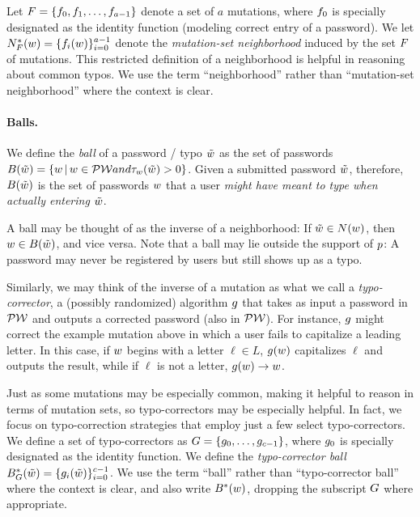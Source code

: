 Let $F = \{f_0, f_1, \ldots, f_{a-1}\}$ denote a set of $a$
mutations, where $f_0$ is specially designated as the identity function
(modeling correct entry of a password). We let $N^*_F({w}) =
\{f_i({w})\}_{i=0}^{a-1}$ denote the {\em mutation-set neighborhood} induced
by the set $F$ of mutations. This restricted definition of a neighborhood
is helpful in reasoning about common typos. We use the term ``neighborhood''
rather than ``mutation-set neighborhood'' where the context is clear.

\paragraph{Balls.} We define the {\em ball} of a password / typo $\tilde{w}$ as
the set of passwords $B(\tilde{w}) = \{{w} \,|\, {w} \in \mathcal{PW} \relax{ and }
\tau_{{w}}(\tilde{w}) > 0\}$.  Given a submitted password $\tilde{w}$,
therefore, $B(\tilde{w})$ is the set of passwords ${w}$ that a user {\em might
have meant to type when actually entering $\tilde{w}$}. 

A ball may be thought of as the inverse of a neighborhood: If $\tilde{w} \in
N({w})$, then ${w} \in B(\tilde{w})$, and vice versa. Note that a ball may
lie outside the support of $p$: A password may never be registered by
users but still shows up as a typo.

Similarly, we may think of the inverse of a mutation as what we call a {\em
typo-corrector}, a (possibly randomized) algorithm $g$ that takes as input a
password in $\mathcal{PW}$ and outputs a corrected password (also in $\mathcal{PW}$).  
For instance, $g$ might correct the example mutation above in
which a user fails to capitalize a leading letter. In this case, if ${w}$ begins
with a letter $\ell \in L$, $g({w})$  capitalizes $\ell$ and outputs the
result, while if $\ell$ is not a letter, $g({w}) \rightarrow {w}$. 

Just as some mutations may be especially common, making it helpful to reason in
terms of mutation sets, so typo-correctors may be especially helpful. In fact,
we focus on typo-correction strategies that employ just a few select
typo-correctors. We define a set of typo-correctors as $G = \{g_0,
\ldots, g_{c-1}\}$, where $g_0$ is specially designated as the
identity function. We define the {\em typo-corrector ball}
$B^*_{G}(\tilde{w}) = \{g_i(\tilde{w})\}_{i=0}^{c-1}$.  We use
the term ``ball'' rather than ``typo-corrector ball'' where the context is
clear, and also write $B^*({w})$, dropping the subscript $G$ where
appropriate.

